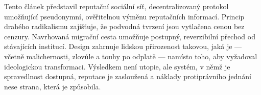 \documentclass[11pt,a4paper,twocolumn]{article}
\begin{document}
Tento článek představil reputační sociální síť, decentralizovaný protokol umožňující pseudonymní, ověřitelnou výměnu reputačních informací. Princip drahého radikalismu zajišťuje, že podvodná tvrzení jsou vytlačena cenou bez cenzury. Navrhovaná migrační cesta umožňuje postupný, reverzibilní přechod od stávajících institucí. Design zahrnuje lidskou přirozenost takovou, jaká je --- včetně malichernosti, zlovůle a touhy po odplatě --- namísto toho, aby vyžadoval ideologickou transformaci. Výsledkem není utopie, ale systém, v němž je spravedlnost dostupná, reputace je zasloužená a náklady protiprávního jednání nese strana, která je způsobila.


\end{document}
